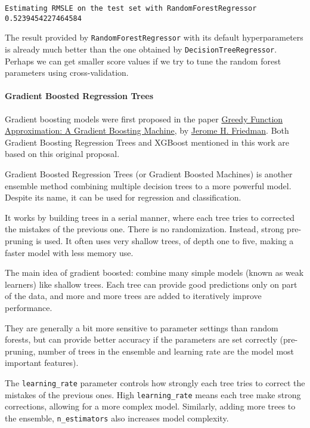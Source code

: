 \documentclass[11pt]{article}
\begin{document}
{    \begin{Verbatim}[commandchars=\\\{\}]
Estimating RMSLE on the test set with RandomForestRegressor
0.5239454227464584

    \end{Verbatim}

    The result provided by \texttt{RandomForestRegressor} with its default
hyperparameters is already much better than the one obtained by
\texttt{DecisionTreeRegressor}. Perhaps we can get smaller score values
if we try to tune the random forest parameters using cross-validation.

    \paragraph{Gradient Boosted Regression
Trees}\label{gradient-boosted-regression-trees}

Gradient boosting models were first proposed in the paper
\href{https://statweb.stanford.edu/~jhf/ftp/trebst.pdf}{Greedy Function
Approximation: A Gradient Boosting Machine}, by
\href{https://statweb.stanford.edu/~jhf/}{Jerome H. Friedman}. Both
Gradient Boosting Regression Trees and XGBoost mentioned in this work
are based on this original proposal.

Gradient Boosted Regression Trees (or Gradient Boosted Machines) is
another ensemble method combining multiple decision trees to a more
powerful model. Despite its name, it can be used for regression and
classification.

It works by building trees in a serial manner, where each tree tries to
corrected the mistakes of the previous one. There is no randomization.
Instead, strong pre-pruning is used. It often uses very shallow trees,
of depth one to five, making a faster model with less memory use.

The main idea of gradient boosted: combine many simple models (known as
weak learners) like shallow trees. Each tree can provide good
predictions only on part of the data, and more and more trees are added
to iteratively improve performance.

They are generally a bit more sensitive to parameter settings than
random forests, but can provide better accuracy if the parameters are
set correctly (pre-pruning, number of trees in the ensemble and learning
rate are the model most important features).

The \texttt{learning\_rate} parameter controls how strongly each tree
tries to correct the mistakes of the previous ones. High
\texttt{learning\_rate} means each tree make strong corrections,
allowing for a more complex model. Similarly, adding more trees to the
ensemble, \texttt{n\_estimators} also increases model complexity.

}
\end{document}
